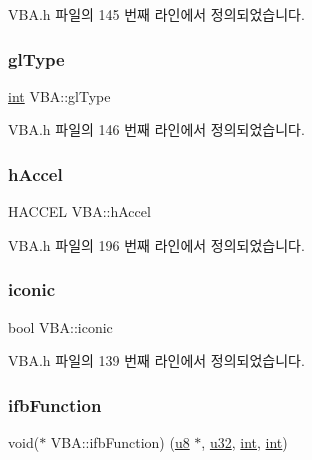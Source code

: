 V\+B\+A.\+h 파일의 145 번째 라인에서 정의되었습니다.

\mbox{\label{class_v_b_a_afb5faab6c2ddf2661b2fe19f118fd882}} 
\subsubsection{\texorpdfstring{gl\+Type}{glType}}
{\footnotesize\ttfamily \mbox{\hyperlink{_util_8cpp_a0ef32aa8672df19503a49fab2d0c8071}{int}} V\+B\+A\+::gl\+Type}



V\+B\+A.\+h 파일의 146 번째 라인에서 정의되었습니다.

\mbox{\label{class_v_b_a_a6ca8052bfc1574a9ef8ca4482563e1e3}} 
\subsubsection{\texorpdfstring{h\+Accel}{hAccel}}
{\footnotesize\ttfamily H\+A\+C\+C\+EL V\+B\+A\+::h\+Accel}



V\+B\+A.\+h 파일의 196 번째 라인에서 정의되었습니다.

\mbox{\label{class_v_b_a_a8507ddf862a4e87df9491b5de3b121c1}} 
\subsubsection{\texorpdfstring{iconic}{iconic}}
{\footnotesize\ttfamily bool V\+B\+A\+::iconic}



V\+B\+A.\+h 파일의 139 번째 라인에서 정의되었습니다.

\mbox{\label{class_v_b_a_af044c0f19b7118a5cc01cf25e059145e}} 
\subsubsection{\texorpdfstring{ifb\+Function}{ifbFunction}}
{\footnotesize\ttfamily void($\ast$ V\+B\+A\+::ifb\+Function) (\mbox{\hyperlink{_system_8h_aed742c436da53c1080638ce6ef7d13de}{u8}} $\ast$, \mbox{\hyperlink{_system_8h_a10e94b422ef0c20dcdec20d31a1f5049}{u32}}, \mbox{\hyperlink{_util_8cpp_a0ef32aa8672df19503a49fab2d0c8071}{int}}, \mbox{\hyperlink{_util_8cpp_a0ef32aa8672df19503a49fab2d0c8071}{int}})}



